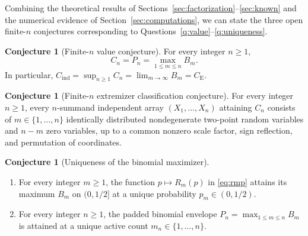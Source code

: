 \documentclass[11pt]{article}
\numberwithin{equation}{section}
\theoremstyle{definition}
\newtheorem{conjecture}[theorem]{Conjecture}
\theoremstyle{remark}
\newcommand{\ce}{C_{\mathrm E}}
\newcommand{\Cind}{C_{\mathrm{ind}}}
\begin{document}
Combining the theoretical results of Sections~\ref{sec:factorization}--\ref{sec:known}
and the numerical evidence of Section~\ref{sec:computations}, we can state the
three open finite-$n$ conjectures corresponding to
Questions~\ref{q:value}--\ref{q:uniqueness}.

\begin{conjecture}[Finite-$n$ value conjecture]\label{conj:value}
For every integer $n\ge1$,
\[
 C_n=P_n=\max_{1\le m\le n}B_m.
\]
In particular, $\Cind=\sup_{n\ge1}C_n=\lim_{m\to\infty}B_m=\ce$.
\end{conjecture}

\begin{conjecture}[Finite-$n$ extremizer classification conjecture]\label{conj:structure}
For every integer $n\ge1$, every $n$-summand independent array
$(X_1,\ldots,X_n)$ attaining $C_n$ consists of $m\in\{1,\ldots,n\}$
identically distributed nondegenerate two-point random variables and $n-m$
zero variables, up to a common nonzero scale factor, sign reflection, and
permutation of coordinates.
\end{conjecture}

\begin{conjecture}[Uniqueness of the binomial maximizer]\label{conj:uniqueness}
\begin{enumerate}[label=(\roman*),leftmargin=2em]
\item For every integer $m\ge1$, the function $p\mapsto R_m(p)$ in
\eqref{eq:rmp} attains its maximum $B_m$ on $(0,1/2]$ at a unique probability
$p_m\in(0,1/2)$.
\item For every integer $n\ge1$, the padded binomial envelope
$P_n=\max_{1\le m\le n}B_m$ is attained at a unique active count
$m_n\in\{1,\ldots,n\}$.
\end{enumerate}
\end{conjecture}
\end{document}
